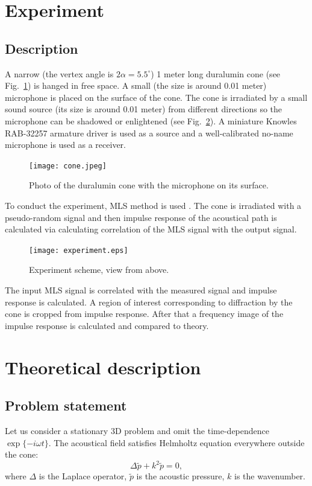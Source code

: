\documentclass{procDDs}
\begin{document}
\section{Experiment}

\subsection{Description}
A narrow (the vertex angle is $2\alpha = 5.5 ^{\circ}$) 1 meter long duralumin cone (see Fig.~\ref{cone}) is hanged in free space. A small (the size is around 0.01 meter) microphone is placed on the surface of the cone. The cone is irradiated by a small sound source (its size is around 0.01 meter) from different directions so the microphone can be shadowed or enlightened (see Fig.~\ref{exp_scheme}). A miniature Knowles RAB-32257 armature driver is used as a source and a well-calibrated no-name microphone is used as a receiver. 

\begin{figure}[t!]\centering
	\texttt{[image: cone.jpeg]}
	\caption{Photo of the duralumin cone with the microphone on its surface.}\label{cone}
\end{figure}


To conduct the experiment, MLS method is used \cite{Shanin}. The cone is irradiated with a pseudo-random signal and then impulse response of the acoustical path is calculated via calculating correlation of the MLS signal with the output signal.

\begin{figure}[t!]\centering
	\texttt{[image: experiment.eps]}
	\caption{Experiment scheme, view from above.}\label{exp_scheme}
\end{figure}

The input MLS signal is correlated with the measured signal and impulse response is calculated. A region of interest corresponding to diffraction by the cone is cropped from impulse response. After that a frequency image of the impulse response is calculated and compared to theory.


\section{Theoretical description}

\subsection{Problem statement}
Let us consider a stationary 3D problem and omit the time-dependence $\exp\{-i\omega t\}$.
The acoustical field satisfies Helmholtz equation everywhere outside the cone:
\begin{equation}\label{helm}                     
\Delta \tilde{p} + k^2 \tilde{p} = 0,                                         
\end{equation}
where $\Delta$ is the Laplace operator, $\tilde{p}$ is the acoustic pressure, $k$ is the wavenumber. 
\end{document}
